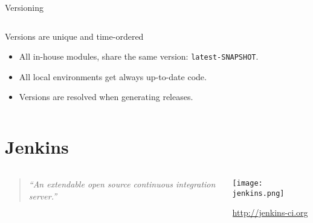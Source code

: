 \documentclass[presentation]{beamer}
\begin{document}
{
\begin{frame}[label=sec-5-4]{Versioning}

\begin{columns}
\begin{column}{0.5\textwidth}
\begin{block}{Versions are unique and time-ordered}

\begin{itemize}
\item All in-house modules, share the same version: \texttt{latest-SNAPSHOT}.
\item All local environments get always up-to-date code.
\item Versions are resolved when generating releases.
\end{itemize}
\end{block}
\end{column}

\begin{column}{0.5\textwidth}

\end{column}
\end{columns}
\end{frame}
} %

\section{Jenkins}
\label{sec-6}

{
\begin{frame}[label=sec-6-1]{}

\begin{columns}
\begin{column}{0.6\textwidth}
\begin{quotation} %

\textit{``An extendable open source continuous integration server.''}
\end{quotation}
\end{column}

\begin{column}{0.4\textwidth}
\texttt{[image: jenkins.png]}

\url{http://jenkins-ci.org}
\end{column}
\end{columns}
\end{frame}
} %
\end{document}
